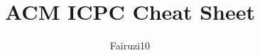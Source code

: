 \documentclass[a4paper, landscape]{article}
\title{\textbf{ACM ICPC Cheat Sheet}}
\author{Fairuzi10}
\date{}
\begin{document}
\setlength{\columnseprule}{0.4pt}
\begin{multicols}{5}
	\tableofcontents
\end{multicols}
\setlength{\columnseprule}{0pt}

\begin{multicols*}{2}
	\maketitle
	
	
	
	
	
	

\end{multicols*}
\end{document}
